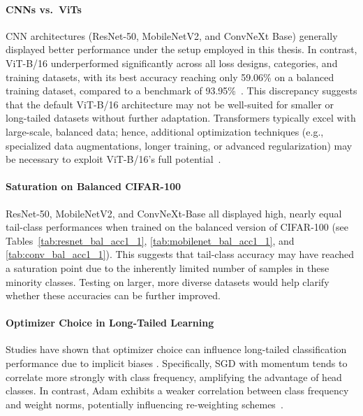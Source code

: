 \paragraph{CNNs vs.\ ViTs}
CNN architectures (ResNet-50, MobileNetV2, and ConvNeXt Base) generally displayed better performance under the setup employed in this thesis. In contrast, ViT-B/16 underperformed significantly across all loss designs, categories, and training datasets, with its best accuracy reaching only 59.06\% on a balanced training dataset, compared to a benchmark of 93.95\%~\cite{ye2023partialfinetuningsuccessorfinetuning}. This discrepancy suggests that the default ViT-B/16 architecture may not be well-suited for smaller or long-tailed datasets without further adaptation. Transformers typically excel with large-scale, balanced data; hence, additional optimization techniques (e.g., specialized data augmentations, longer training, or advanced regularization) may be necessary to exploit ViT-B/16’s full potential~\cite{menon2021longtaillearninglogitadjustment,loshchilov2018fixing}.

\paragraph{Saturation on Balanced CIFAR-100}
ResNet-50, MobileNetV2, and ConvNeXt-Base all displayed high, nearly equal tail-class performances when trained on the balanced version of CIFAR-100 (see Tables~\ref{tab:resnet_bal_acc1_1}, \ref{tab:mobilenet_bal_acc1_1}, and \ref{tab:conv_bal_acc1_1}). This suggests that tail-class accuracy may have reached a saturation point due to the inherently limited number of samples in these minority classes. Testing on larger, more diverse datasets would help clarify whether these accuracies can be further improved.

\paragraph{Optimizer Choice in Long-Tailed Learning}
Studies have shown that optimizer choice can influence long-tailed classification performance due to implicit biases \cite{soudry2024implicitbias,menon2021longtaillearninglogitadjustment}. Specifically, SGD with momentum tends to correlate more strongly with class frequency, amplifying the advantage of head classes. In contrast, Adam exhibits a weaker correlation between class frequency and weight norms, potentially influencing re-weighting schemes~\cite{menon2021longtaillearninglogitadjustment}.

